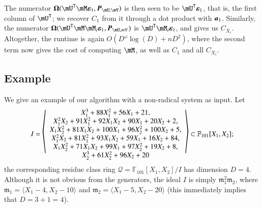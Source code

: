 \documentclass[final,1p,times,authoryear]{elsarticle}
\newcommand{\mat}[1]{\bm{\MakeUppercase{#1}}} %
\newcommand{\row}[1]{\bm{\MakeLowercase{#1}}} %
\newcommand{\col}[1]{\bm{\MakeLowercase{#1}}} %
\newcommand{\residueI}{\mathscr{Q}}
\newcommand{\trsp}[1]{#1^{\mathsf{T}}} %
\def\F {\ensuremath{\mathbb{F}}}
\newcommand{\mUt}{\trsp{\mU}}
\begin{document}
The numerator $\mat{\Omega}(\mUt \mM \col{\varepsilon}_1,
\mat{P}_{\mU,\mV})$ is then seen to be $\mUt \col{\varepsilon}_1$, that is, the
first column of $\mUt$; we recover $C_1$ from it through a dot
product with $\row{a}_1$. Similarly, the numerator
$\mat{\Omega}(\mUt \mM \mM_i \col{\varepsilon}_1,
\mat{P}_{\mU,mV})$ is $\mUt \mM_i \col{\varepsilon}_1$, and gives
us $C_{X_i}$. Altogether, the runtime is again $O(D^{\omega} \log(D) +
nD^2)$, where the second term now gives the cost of computing $\mM$,
as well as $C_1$ and all $C_{X_i}$.


\subsection{Example}

We give an example of our algorithm with a non-radical system as input. Let
$$
I = 
\sbox0{$\begin{array}{c}
    X_1^3 + 88X_1^2 + 56X_1 + 21,\\
    X_1^2X_2 + 91X_1^2 + 92X_1X_2 + 90X_1 + 20X_2 + 2,\\
    X_1X_2^2 + 81X_1X_2 + 100X_1 + 96X_2^2 + 100X_2 + 5,\\
    X_1^2X_2 + 81X_1^2 + 93X_1X_2 + 59X_1 + 16X_2 + 84,\\
    X_1X_2^2 + 71X_1X_2 + 99X_1 + 97X_2^2 + 19X_2 + 8,\\
    X_2^3 + 61X_2^2 + 96X_2 + 20
\end{array}$}
\mathopen{\resizebox{1.2\width}{\ht0}{$\Bigg\langle$}}
  \usebox{0}
\mathclose{\resizebox{1.2\width}{\ht0}{$\Bigg\rangle$}}
\subset \F_{101}[X_1,X_2];
$$ the corresponding residue class ring $\residueI=\F_{101}[X_1,X_2]/I$
has dimension $D=4$.  Although it is not obvious from the generators,
the ideal $I$ is simply $\mathfrak{m}_1^2 \mathfrak{m}_2$, where
$\mathfrak{m}_1 =\langle X_1-4,X_2-10\rangle$ and $\mathfrak{m}_2
=\langle X_1-5,X_2-20\rangle$ (this immediately implies that $D=3+1=4$).
\end{document}
